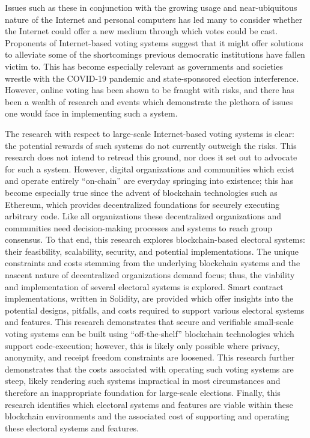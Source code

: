 
Issues such as these in conjunction with the growing usage and near-ubiquitous
nature of the Internet and personal computers has led many to consider whether
the Internet could offer a new medium through which votes could be cast.
Proponents of Internet-based voting systems suggest that it might offer
solutions to alleviate some of the shortcomings previous democratic institutions
have fallen victim to. This has become especially relevant as governments and
societies wrestle with the COVID-19 pandemic and state-sponsored election
interference. However, online voting has been shown to be fraught with risks,
and there has been a wealth of research and events which demonstrate the
plethora of issues one would face in implementing such a system.\cite{serve-analysis,dc-voting-system}

The research with respect to large-scale Internet-based voting systems is clear:
the potential rewards of such systems do not currently outweigh the
risks.\cite{comment-on-dod-report} This research does not intend to retread this
ground, nor does it set out to advocate for such a system. However, digital
organizations and communities which exist and operate entirely ``on-chain'' are
everyday springing into existence; this has become especially true since the
advent of blockchain technologies such as Ethereum, which provides decentralized
foundations for securely executing arbitrary code.\cite{ethereum.org,DAO} Like
all organizations these decentralized organizations and communities need
decision-making processes and systems to reach group consensus. To that end,
this research explores blockchain-based electoral systems: their feasibility,
scalability, security, and potential implementations. The unique constraints and
costs stemming from the underlying blockchain systems and the nascent nature of
decentralized organizations demand focus; thus, the viability and implementation
of several electoral systems is explored. Smart contract implementations,
written in Solidity, are provided which offer insights into the potential
designs, pitfalls, and costs required to support various electoral systems and
features. This research demonstrates that secure and verifiable small-scale
voting systems can be built using ``off-the-shelf'' blockchain technologies
which support code-execution; however, this is likely only possible where
privacy, anonymity, and receipt freedom constraints are loosened. This research
further demonstrates that the costs associated with operating such voting
systems are steep, likely rendering such systems impractical in most
circumstances and therefore an inappropriate foundation for large-scale
elections. Finally, this research identifies which electoral systems and
features are viable within these blockchain environments and the associated cost
of supporting and operating these electoral systems and features.


